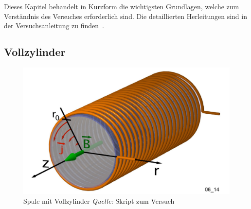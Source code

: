 Dieses Kapitel  behandelt in Kurzform  die wichtigsten Grundlagen,  welche zum
Verst\"andnis des Versuches erforderlich sind. Die detaillierten Herleitungen
sind in der Versuchsanleitung zu finden~\cite{ref:looser:skineffekt}.

%
%
%


\subsection{Vollzylinder}
\label{sec:arbgru:subsec:vollzylinder}

\begin{figure}[th!]
    \centering
    \includegraphics[width=.33\textwidth]{images/spule-vollzylinder.png}
    \caption{Spule mit Vollzylinder \emph{Quelle:} Skript zum Versuch~\cite{ref:looser:skineffekt}}
    \label{fig:looser:vollzylinder}
\end{figure}


